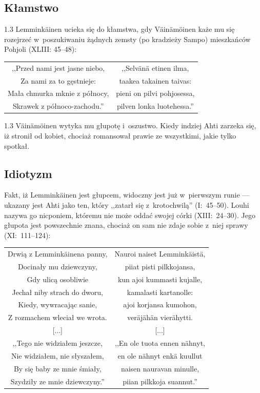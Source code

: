 \documentclass[11pt,a4paper,twoside]{report}
\begin{document}
\subsection*{Kłamstwo}
\begin{spacing}{1.3}
Lemminkäinen ucieka się do kłamstwa, gdy Väinämöinen każe mu się rozejrzeć w~poszukiwaniu żądnych zemsty (po kradzieży Sampo) mieszkańców Pohjoli (XLIII: 45--48):
\end{spacing}
{\centering
\small
\begin{longtable}{c c}
,,Przed nami jest jasne niebo, & ,,Selvänä etinen ilma, \\
Za nami za to gęstnieje: & taakea takainen taivas: \\
Mała chmurka mknie z północy, & pieni on pilvi pohjosessa, \\
Skrawek z północo-zachodu.'' & pilven lonka luotehessa.'' \\
\end{longtable}
}
\begin{spacing}{1.3}
Väinämöinen wytyka mu głupotę i~oszustwo. Kiedy indziej Ahti zarzeka się, iż stronił od kobiet, chociaż romansował prawie ze wszystkimi, jakie tylko spotkał.

\vspace*{0.5\baselineskip}
\subsection*{Idiotyzm}

Fakt, iż Lemminkäinen jest głupcem, widoczny jest już w~pierwszym runie --- ukazany jest Ahti jako ten, który ,,zatarł się z~krotochwilą'' (I:~45--50). Louhi nazywa go nicponiem, któremu nie może oddać swojej córki (XIII:~24--30). Jego głupota jest powszechnie znana, chociaż on sam nie zdaje sobie z~niej sprawy (XI:~111--124):
\end{spacing}
{\centering
\small
\begin{longtable}{c c}
Drwią z Lemminkäinena panny, & Nauroi naiset Lemminkäistä, \\
Docinały mu dziewczyny, & piiat pisti pilkkojansa, \\
Gdy ulicą osobliwie & kun ajoi kummasti kujalle, \\
Jechał niby strach do dworu, & kamalasti kartanolle: \\
Kiedy, wywracając sanie, & ajoi korjansa kumohon, \\
Z rozmachem wleciał we wrota. & veräjähän vierähytti. \\
{[...]} & {[...]} \\
,,Tego nie widziałem jeszcze, & ,,En ole tuota ennen nähnyt, \\
Nie widziałem, nie słyszałem, & en ole nähnyt enkä kuullut \\
By się baby ze mnie śmiały, & naisen nauravan minulle, \\
Szydziły ze mnie dziewczyny.'' & piian pilkkoja suannut.'' \\
\end{longtable}
}
\end{document}
